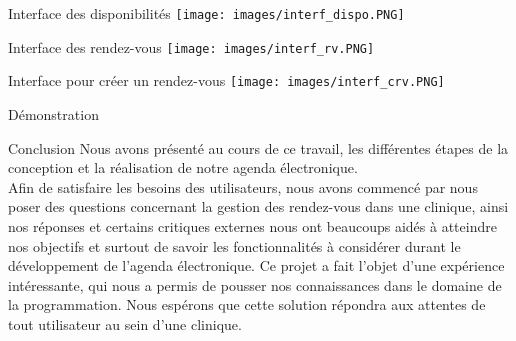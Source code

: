 \documentclass{beamer}
\begin{document}
\begin{frame}{Interface des disponibilités}
\texttt{[image: images/interf\_dispo.PNG]}
\end{frame}

\begin{frame}{Interface des rendez-vous}
\texttt{[image: images/interf\_rv.PNG]}
\end{frame}

\begin{frame}{Interface pour créer un rendez-vous}
\texttt{[image: images/interf\_crv.PNG]}
\end{frame}

\begin{frame}{Démonstration}
\end{frame}

\begin{frame}{Conclusion}
Nous avons présenté au cours de ce travail, les différentes étapes de la conception et la réalisation de notre agenda électronique.
\\Afin de satisfaire les besoins des utilisateurs, nous avons commencé par nous poser des questions concernant la gestion des rendez-vous dans une clinique, ainsi nos réponses et certains critiques externes nous ont beaucoups aidés à atteindre nos objectifs et surtout de savoir les fonctionnalités à considérer durant le développement de l'agenda électronique.
Ce projet a fait l'objet d'une expérience intéressante, qui nous a permis de pousser nos connaissances dans le domaine de la programmation. Nous espérons que cette solution répondra aux attentes de tout utilisateur au sein d'une clinique.
\end{frame}
\end{document}
